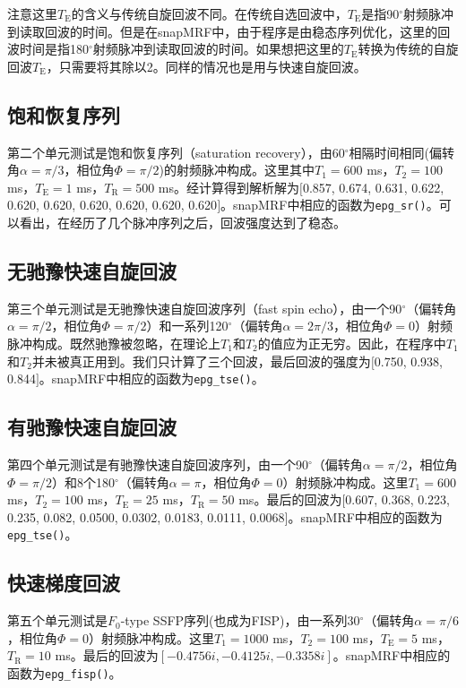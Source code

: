 注意这里$T_\mathrm{E}$的含义与传统自旋回波不同。在传统自选回波中，$T_\mathrm{E}$是指90$^{\circ}$射频脉冲到读取回波的时间。但是在snapMRF中，由于程序是由稳态序列优化，这里的回波时间是指180$^{\circ}$射频脉冲到读取回波的时间。如果想把这里的$T_\mathrm{E}$转换为传统的自旋回波$T_\mathrm{E}$，只需要将其除以2。同样的情况也是用与快速自旋回波。

\subsection{饱和恢复序列}
第二个单元测试是饱和恢复序列（saturation recovery），由60$^{\circ}$相隔时间相同(偏转角$\alpha = \pi/3$，相位角$\Phi = \pi/2$)的射频脉冲构成。这里其中$T_1 = 600$ ms，$T_2 = 100$ ms，$T_\mathrm{E} = 1$ ms，$T_\mathrm{R} = 500$ ms。经计算得到解析解为$[$0.857, 0.674, 0.631, 0.622, 0.620, 0.620, 0.620, 0.620, 0.620, 0.620$]$。snapMRF中相应的函数为\texttt{epg\_sr()}。可以看出，在经历了几个脉冲序列之后，回波强度达到了稳态。

\subsection{无驰豫快速自旋回波}
第三个单元测试是无驰豫快速自旋回波序列（fast spin echo），由一个90$^{\circ}$（偏转角$\alpha = \pi/2$，相位角$\Phi = \pi/2$）和一系列120$^{\circ}$（偏转角$\alpha = 2\pi/3$，相位角$\Phi = 0$）射频脉冲构成。既然驰豫被忽略，在理论上$T_1$和$T_2$的值应为正无穷。因此，在程序中$T_1$和$T_2$并未被真正用到。我们只计算了三个回波，最后回波的强度为$[$0.750, 0.938, 0.844$]$。snapMRF中相应的函数为\texttt{epg\_tse()}。

\subsection{有驰豫快速自旋回波}
第四个单元测试是有驰豫快速自旋回波序列，由一个90$^{\circ}$（偏转角$\alpha = \pi/2$，相位角$\Phi = \pi/2$）和8个180$^{\circ}$（偏转角$\alpha = \pi$，相位角$\Phi = 0$）射频脉冲构成。这里$T_1 = 600$ ms，$T_2 = 100$ ms，$T_\mathrm{E} = 25$ ms，$T_\mathrm{R} = 50$ ms。最后的回波为$[$0.607, 0.368, 0.223, 0.235, 0.082, 0.0500, 0.0302, 0.0183, 0.0111, 0.0068$]$。snapMRF中相应的函数为\texttt{epg\_tse()}。

\subsection{快速梯度回波}
第五个单元测试是$F_0$-type SSFP序列(也成为FISP)，由一系列30$^{\circ}$（偏转角$\alpha = \pi/6$，相位角$\Phi = 0$）射频脉冲构成。这里$T_1 = 1000$ ms，$T_2 = 100$ ms，$T_\mathrm{E} = 5$ ms，$T_\mathrm{R} = 10$ ms。最后的回波为$[-0.4756i, -0.4125i, -0.3358i]$。snapMRF中相应的函数为\texttt{epg\_fisp()}。

